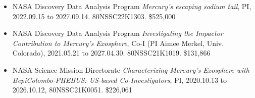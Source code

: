 \documentclass[12pt]{report}
\begin{document}
\begin{itemize}
 \item NASA Discovery Data Analysis Program {\it Mercury's escaping sodium tail}, PI, 2022.09.15 to 2027.09.14. 80NSSC22K1303. \$525,000
 \item NASA Discovery Data Analysis Program {\it Investigating the Impactor Contribution to Mercury's Exosphere}, Co-I (PI Aimee Merkel, Univ. Colorado), 2021.05.21 to 2027.04.30. 80NSSC21K1019. \$131,866
 \item NASA Science Mission Directorate {\it Characterizing Mercury’s Exosphere with BepiColombo-PHEBUS: US-based Co-Investigators}, PI, 2020.10.13 to 2026.10.12, 80NSSC21K0051. \$226,061

\end{itemize}
\end{document}
